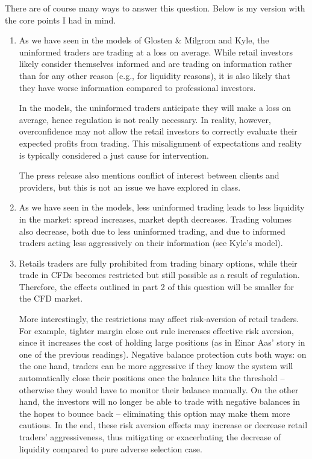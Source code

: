 \documentclass[11pt
, answers
]{exam}
\begin{document}
\begin{solution}
	There are of course many ways to answer this question. Below is my version with the core points I had in mind.
	
	\begin{enumerate}
		\item As we have seen in the models of Glosten \& Milgrom and Kyle, the uninformed traders are trading at a loss on average. While retail investors likely consider themselves informed and are trading on information rather than for any other reason (e.g., for liquidity reasons), it is also likely that they have worse information compared to professional investors. 
		
		In the models, the uninformed traders anticipate they will make a loss on average, hence regulation is not really necessary. In reality, however, overconfidence may not allow the retail investors to correctly evaluate their expected profits from trading. This misalignment of expectations and reality is typically considered a just cause for intervention.
		
		The press release also mentions conflict of interest between clients and providers, but this is not an issue we have explored in class.
		
		\item As we have seen in the models, less uninformed trading leads to less liquidity in the market: spread increases, market depth decreases. Trading volumes also decrease, both due to less uninformed trading, and due to informed traders acting less aggressively on their information (see Kyle's model).
		
		\item Retails traders are fully prohibited from trading binary options, while their trade in CFDs becomes restricted but still possible as a result of regulation. Therefore, the effects outlined in part 2 of this question will be smaller for the CFD market. 
		
		More interestingly, the restrictions may affect risk-aversion of retail traders. For example, tighter margin close out rule increases effective risk aversion, since it increases the cost of holding large positions (as in Einar Aas' story in one of the previous readings). Negative balance protection cuts both ways: on the one hand, traders can be more aggressive if they know the system will automatically close their positions once the balance hits the threshold -- otherwise they would have to monitor their balance manually. On the other hand, the investors will no longer be able to trade with negative balances in the hopes to bounce back -- eliminating this option may make them more cautious. In the end, these risk aversion effects may increase or decrease retail traders' aggressiveness, thus mitigating or exacerbating the decrease of liquidity compared to pure adverse selection case.
	\end{enumerate}
\end{solution}
\end{document}
